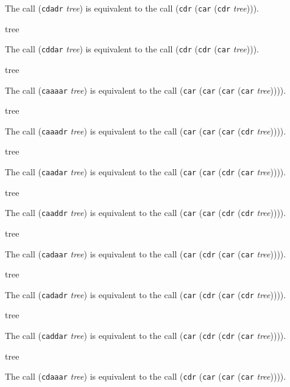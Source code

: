 The call (\texttt{cdadr} \textit{tree}) is equivalent to the call
(\texttt{cdr} (\texttt{car} (\texttt{cdr} \textit{tree}))).


 {tree}

The call (\texttt{cddar} \textit{tree}) is equivalent to the call
(\texttt{cdr} (\texttt{cdr} (\texttt{car} \textit{tree}))).

 {tree}

The call (\texttt{caaaar} \textit{tree}) is equivalent to the call
(\texttt{car} (\texttt{car} (\texttt{car} (\texttt{car}
\textit{tree})))).

 {tree}

The call (\texttt{caaadr} \textit{tree}) is equivalent to the call
(\texttt{car} (\texttt{car} (\texttt{car} (\texttt{cdr}
\textit{tree})))).

 {tree}

The call (\texttt{caadar} \textit{tree}) is equivalent to the call
(\texttt{car} (\texttt{car} (\texttt{cdr} (\texttt{car}
\textit{tree})))).

 {tree}

The call (\texttt{caaddr} \textit{tree}) is equivalent to the call
(\texttt{car} (\texttt{car} (\texttt{cdr} (\texttt{cdr}
\textit{tree})))).

 {tree}

The call (\texttt{cadaar} \textit{tree}) is equivalent to the call
(\texttt{car} (\texttt{cdr} (\texttt{car} (\texttt{car}
\textit{tree})))).

 {tree}

The call (\texttt{cadadr} \textit{tree}) is equivalent to the call
(\texttt{car} (\texttt{cdr} (\texttt{car} (\texttt{cdr}
\textit{tree})))).

 {tree}

The call (\texttt{caddar} \textit{tree}) is equivalent to the call
(\texttt{car} (\texttt{cdr} (\texttt{cdr} (\texttt{car}
\textit{tree})))).

 {tree}

The call (\texttt{cdaaar} \textit{tree}) is equivalent to the call
(\texttt{cdr} (\texttt{car} (\texttt{car} (\texttt{car}
\textit{tree})))).
